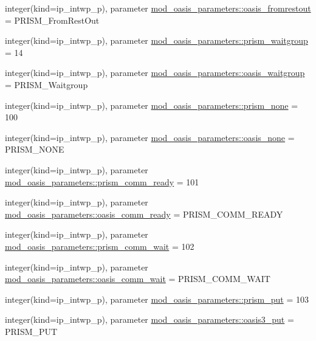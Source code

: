 \begin{DoxyCompactItemize}
\item 
integer(kind=ip\+\_\+intwp\+\_\+p), parameter \hyperlink{namespacemod__oasis__parameters_a76a87a170e0c08863ae981693eb88fb8}{mod\+\_\+oasis\+\_\+parameters\+::oasis\+\_\+fromrestout} = P\+R\+I\+S\+M\+\_\+\+From\+Rest\+Out
\item 
integer(kind=ip\+\_\+intwp\+\_\+p), parameter \hyperlink{namespacemod__oasis__parameters_ae5cbdfb558e82bfb8695a8cf425780cb}{mod\+\_\+oasis\+\_\+parameters\+::prism\+\_\+waitgroup} = 14
\item 
integer(kind=ip\+\_\+intwp\+\_\+p), parameter \hyperlink{namespacemod__oasis__parameters_a2cc23572d33c536d49a53587359b68f0}{mod\+\_\+oasis\+\_\+parameters\+::oasis\+\_\+waitgroup} = P\+R\+I\+S\+M\+\_\+\+Waitgroup
\item 
integer(kind=ip\+\_\+intwp\+\_\+p), parameter \hyperlink{namespacemod__oasis__parameters_a81e4e20be511cd8be2ab3881b42f8f3e}{mod\+\_\+oasis\+\_\+parameters\+::prism\+\_\+none} = 100
\item 
integer(kind=ip\+\_\+intwp\+\_\+p), parameter \hyperlink{namespacemod__oasis__parameters_a368402af56fd08ed95ad88d0c987733a}{mod\+\_\+oasis\+\_\+parameters\+::oasis\+\_\+none} = P\+R\+I\+S\+M\+\_\+\+N\+O\+NE
\item 
integer(kind=ip\+\_\+intwp\+\_\+p), parameter \hyperlink{namespacemod__oasis__parameters_a953f0a4738f9ca919cf5e446998cc79e}{mod\+\_\+oasis\+\_\+parameters\+::prism\+\_\+comm\+\_\+ready} = 101
\item 
integer(kind=ip\+\_\+intwp\+\_\+p), parameter \hyperlink{namespacemod__oasis__parameters_a8484e196ef7469adbeaef850787d7502}{mod\+\_\+oasis\+\_\+parameters\+::oasis\+\_\+comm\+\_\+ready} = P\+R\+I\+S\+M\+\_\+\+C\+O\+M\+M\+\_\+\+R\+E\+A\+DY
\item 
integer(kind=ip\+\_\+intwp\+\_\+p), parameter \hyperlink{namespacemod__oasis__parameters_a3d0349d8815bf1848122d99993097842}{mod\+\_\+oasis\+\_\+parameters\+::prism\+\_\+comm\+\_\+wait} = 102
\item 
integer(kind=ip\+\_\+intwp\+\_\+p), parameter \hyperlink{namespacemod__oasis__parameters_a9df795bd9123857642aae31661b6c13a}{mod\+\_\+oasis\+\_\+parameters\+::oasis\+\_\+comm\+\_\+wait} = P\+R\+I\+S\+M\+\_\+\+C\+O\+M\+M\+\_\+\+W\+A\+IT
\item 
integer(kind=ip\+\_\+intwp\+\_\+p), parameter \hyperlink{namespacemod__oasis__parameters_ad8db79b2d411e8f04445dcc2ed619548}{mod\+\_\+oasis\+\_\+parameters\+::prism\+\_\+put} = 103
\item 
integer(kind=ip\+\_\+intwp\+\_\+p), parameter \hyperlink{namespacemod__oasis__parameters_a325334a5e2f9d0c7846c1ef964f9f7e3}{mod\+\_\+oasis\+\_\+parameters\+::oasis3\+\_\+put} = P\+R\+I\+S\+M\+\_\+\+P\+UT

\end{DoxyCompactItemize}
